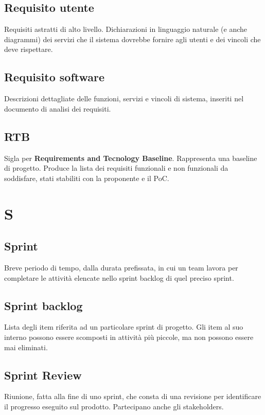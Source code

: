 \documentclass[a4paper,12pt]{article}
\begin{document}
\subsection*{Requisito utente}
Requisiti astratti di alto livello.  
Dichiarazioni in linguaggio naturale (e anche diagrammi) dei servizi che il sistema dovrebbe fornire agli utenti e dei vincoli che deve rispettare.

\subsection*{Requisito software}
Descrizioni dettagliate delle funzioni, servizi e vincoli di sistema, inseriti nel documento di analisi dei requisiti.

\subsection*{RTB}
Sigla per \textbf{Requirements and Tecnology Baseline}. Rappresenta una baseline di progetto. Produce la lista dei requisiti funzionali e non funzionali da soddisfare, stati stabiliti con la proponente e il PoC.

\clearpage

\section{S}

\subsection*{Sprint}
Breve periodo di tempo, dalla durata prefissata, in cui un team lavora per completare le attività elencate nello sprint backlog di quel preciso sprint.

\subsection*{Sprint backlog}
Lista degli item riferita ad un particolare sprint di progetto. Gli item al suo interno possono essere scomposti in attività più piccole, ma non possono essere mai eliminati.

\subsection*{Sprint Review}
Riunione, fatta alla fine di uno sprint, che consta di una revisione per identificare il progresso eseguito sul prodotto. Partecipano anche gli stakeholders.
\end{document}
